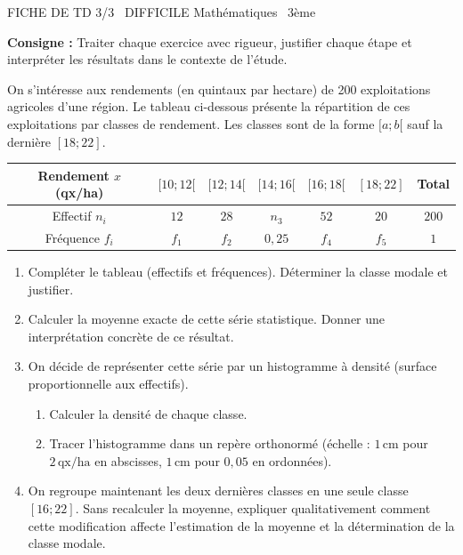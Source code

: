 \documentclass[11pt]{article}
\begin{document}
\begin{tcolorbox}[enhanced,colback=popink,colframe=popink,arc=10pt,boxrule=0pt,left=12pt,right=12pt,top=9pt,bottom=9pt]
{\color{white}\popxbold\small FICHE DE TD 3/3 \textbullet\ DIFFICILE \hfill Mathématiques \textbullet\ 3ème\par}
\end{tcolorbox}
\vspace{4pt}
\noindent \textbf{Consigne :} Traiter chaque exercice avec rigueur, justifier chaque étape et interpréter les résultats dans le contexte de l'étude.

\begin{exercice}
On s'intéresse aux rendements (en quintaux par hectare) de \num{200} exploitations agricoles d'une région. Le tableau ci-dessous présente la répartition de ces exploitations par classes de rendement. Les classes sont de la forme $[a ; b[$ sauf la dernière $[18 ; 22]$.

\begin{center}
\begin{tabular}{|c|c|c|c|c|c|c|}
\hline
Rendement $x$ (qx/ha) & $[10 ; 12[$ & $[12 ; 14[$ & $[14 ; 16[$ & $[16 ; 18[$ & $[18 ; 22]$ & Total \\
\hline
Effectif $n_i$ & $12$ & $28$ & $n_3$ & $52$ & $20$ & $200$ \\
\hline
Fréquence $f_i$ & $f_1$ & $f_2$ & $0,25$ & $f_4$ & $f_5$ & $1$ \\
\hline
\end{tabular}
\end{center}

\begin{enumerate}
    \item Compléter le tableau (effectifs et fréquences). Déterminer la classe modale et justifier.
    \item Calculer la moyenne exacte de cette série statistique. Donner une interprétation concrète de ce résultat.
    \item On décide de représenter cette série par un histogramme à densité (surface proportionnelle aux effectifs).
    \begin{enumerate}
        \item Calculer la densité de chaque classe.
        \item Tracer l'histogramme dans un repère orthonormé (échelle : $1\,\text{cm}$ pour $2\,\text{qx/ha}$ en abscisses, $1\,\text{cm}$ pour $0,05$ en ordonnées).
    \end{enumerate}
    \item On regroupe maintenant les deux dernières classes en une seule classe $[16 ; 22]$. Sans recalculer la moyenne, expliquer qualitativement comment cette modification affecte l'estimation de la moyenne et la détermination de la classe modale.
\end{enumerate}
\end{exercice}
\end{document}
